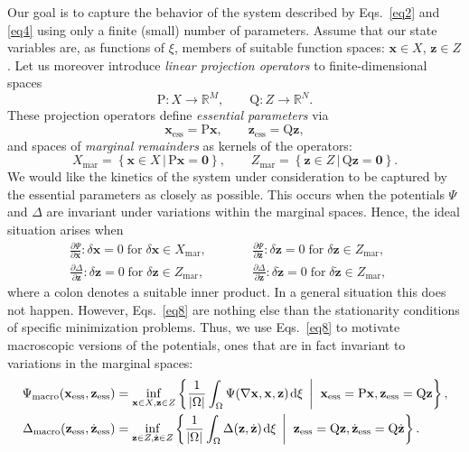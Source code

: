 \documentclass[final,1p,times]{elsarticle}
\newcommand{\be}{\begin{equation}}
\newcommand{\ee}{\end{equation}}
\newcommand{\bfm}[1]{ \mathbf{#1} }
\def\dd{\;\!\mathrm{d}}
\renewcommand{\inf}[3]{
\underset{#1}{\mathrm{inf}}\left\lbrace #2 \; \left| \vphantom{#2}\vphantom{#3} \right. \; #3 \right\rbrace
}
\begin{document}
Our goal is to capture the behavior of the system described by Eqs.\  \eqref{eq2} and \eqref{eq4} using only a finite (small) number of parameters. Assume that our state variables are, as functions of $\xi$, members of suitable function spaces: $\bfm{x}\in X$, $\bfm{z}\in Z$. Let us moreover introduce \emph{linear projection operators} to finite-dimensional spaces
\be
\label{eq5}
\mathrm{P}: X \longrightarrow \mathbb{R}^M, \qquad \mathrm{Q}: Z \longrightarrow \mathbb{R}^N.
\ee
These projection operators define \emph{essential parameters} via
\be
\label{eq6}
\bfm{x}_\mathrm{ess}=\mathrm{P}\bfm{x}, \qquad \bfm{z}_\mathrm{ess}=\mathrm{Q}\bfm{z},
\ee
and spaces of \emph{marginal remainders} as kernels of the operators:
\be
\label{eq7}
X_\mathrm{mar} = \left\lbrace \bfm{x} \in X \,|\, \mathrm{P}\bfm{x} = \mathbf{0} \right\rbrace, \qquad 
Z_\mathrm{mar} = \left\lbrace \bfm{z} \in Z \,|\, \mathrm{Q}\bfm{z} = \mathbf{0} \right\rbrace.
\ee
We would like the kinetics of the system under consideration to be captured by the essential parameters as closely as possible. This occurs when the potentials $\Psi$ and $\Delta$ are invariant under variations within the marginal spaces. Hence, the ideal situation arises when
\be
\label{eq8}\begin{aligned}
&\frac{\partial \Psi}{\partial \bfm{x}}:\delta\bfm{x} = 0 \; \mbox{for} \; \delta\bfm{x} \in X_\mathrm{mar}, \qquad
&&\frac{\partial \Psi}{\partial \bfm{z}}:\delta\bfm{z} = 0 \; \mbox{for} \; \delta\bfm{z} \in Z_\mathrm{mar}, \qquad\\
&\frac{\partial \Delta}{\partial \bfm{z}}:\delta\bfm{z} = 0 \; \mbox{for} \; \delta\bfm{z} \in Z_\mathrm{mar}, \qquad
&&\frac{\partial \Delta}{\partial \dot{\bfm{z}}}:\delta\dot{\bfm{z}} = 0 \; \mbox{for} \; \delta\dot{\bfm{z}} \in Z_\mathrm{mar},\end{aligned}
\ee
where a colon denotes a suitable inner product. In a general situation this does not happen.  However, Eqs.\ \eqref{eq8} are nothing else than the stationarity conditions of specific minimization problems. Thus, we use  Eqs.\ \eqref{eq8} to motivate macroscopic versions of the potentials, ones that are in fact invariant to variations in the marginal spaces:
\begin{align}
\label{eq9}
\Psi_\mathrm{macro}(\bfm{x}_\mathrm{ess},\bfm{z}_\mathrm{ess}) &=
\inf{\bfm{x} \in X, \bfm{z} \in Z}{\frac{1}{|\Omega|}\int_\Omega \Psi(\nabla\bfm{x},\bfm{x},\bfm{z}) \dd\xi}{ \bfm{x}_\mathrm{ess}=\mathrm{P}\bfm{x}, \bfm{z}_\mathrm{ess}=\mathrm{Q}\bfm{z}}, \\
\label{eq10}
\Delta_\mathrm{macro}(\bfm{z}_\mathrm{ess},\dot{\bfm{z}}_\mathrm{ess}) &=
\inf{\bfm{z} \in Z, \dot{\bfm{z}} \in Z}{\frac{1}{|\Omega|}\int_\Omega \Delta(\bfm{z},\dot{\bfm{z}}) \dd\xi}{ \bfm{z}_\mathrm{ess}=\mathrm{Q}\bfm{z}, \dot{\bfm{z}}_\mathrm{ess}=\mathrm{Q}\dot{\bfm{z}}}.
\end{align}
\end{document}
